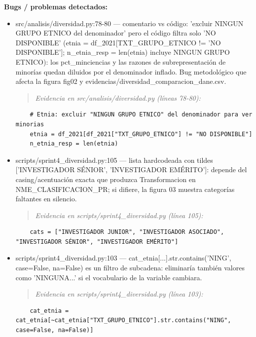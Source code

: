 \begin{tcolorbox}[riesgo]
\textbf{Bugs / problemas detectados:}
\begin{itemize}
  \item src/analisis/diversidad.py:78-80 --- comentario vs código: 'excluir NINGUN GRUPO ETNICO del denominador' pero el código filtra solo 'NO DISPONIBLE' (etnia = df\_2021[TXT\_GRUPO\_ETNICO != 'NO DISPONIBLE']; n\_etnia\_resp = len(etnia) incluye NINGUN GRUPO ETNICO): los pct\_minciencias y las razones de subrepresentación de minorías quedan diluidos por el denominador inflado. Bug metodológico que afecta la figura fig02 y evidencias/diversidad\_comparacion\_dane.csv.
\begin{quote}\footnotesize\ttfamily
\noindent\emph{Evidencia en src/analisis/diversidad.py (líneas 78-80):}
\end{quote}
\begin{lstlisting}
    # Etnia: excluir "NINGUN GRUPO ETNICO" del denominador para ver minorias
    etnia = df_2021[df_2021["TXT_GRUPO_ETNICO"] != "NO DISPONIBLE"]
    n_etnia_resp = len(etnia)
\end{lstlisting}

  \item scripts/sprint4\_diversidad.py:105 --- lista hardcodeada con tildes ['INVESTIGADOR SÉNIOR', 'INVESTIGADOR EMÉRITO']: depende del casing/acentuación exacta que produzca Transformacion en NME\_CLASIFICACION\_PR; si difiere, la figura 03 muestra categorías faltantes en silencio.
\begin{quote}\footnotesize\ttfamily
\noindent\emph{Evidencia en scripts/sprint4\_diversidad.py (línea 105):}
\end{quote}
\begin{lstlisting}
    cats = ["INVESTIGADOR JUNIOR", "INVESTIGADOR ASOCIADO", "INVESTIGADOR SÉNIOR", "INVESTIGADOR EMÉRITO"]
\end{lstlisting}

  \item scripts/sprint4\_diversidad.py:103 --- cat\_etnia[...].str.contains('NING', case=False, na=False) es un filtro de subcadena: eliminaría también valores como 'NINGUNA...' si el vocabulario de la variable cambiara.
\begin{quote}\footnotesize\ttfamily
\noindent\emph{Evidencia en scripts/sprint4\_diversidad.py (línea 103):}
\end{quote}
\begin{lstlisting}
    cat_etnia = cat_etnia[~cat_etnia["TXT_GRUPO_ETNICO"].str.contains("NING", case=False, na=False)]
\end{lstlisting}


\end{itemize}
\end{tcolorbox}
